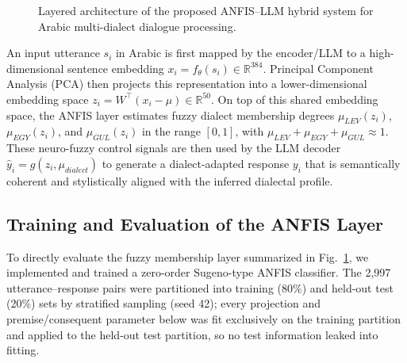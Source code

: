 \documentclass[conference]{IEEEtran}
\begin{document}
\begin{figure}[t]
\centering
{}
\caption{Layered architecture of the proposed ANFIS--LLM hybrid system for Arabic multi-dialect dialogue processing.}
\label{fig:architecture}
\end{figure}

An input utterance $s_i$ in Arabic is first mapped by the encoder/LLM to a high-dimensional sentence embedding $x_i = f_\theta(s_i) \in \mathbb{R}^{384}$. Principal Component Analysis (PCA) then projects this representation into a lower-dimensional embedding space $z_i = W^\top(x_i - \mu) \in \mathbb{R}^{50}$. On top of this shared embedding space, the ANFIS layer estimates fuzzy dialect membership degrees $\mu_{LEV}(z_i)$, $\mu_{EGY}(z_i)$, and $\mu_{GUL}(z_i)$ in the range $[0,1]$, with $\mu_{LEV} + \mu_{EGY} + \mu_{GUL} \approx 1$. These neuro-fuzzy control signals are then used by the LLM decoder $\hat{y}_i = g(z_i, \mu_{dialect})$ to generate a dialect-adapted response $y_i$ that is semantically coherent and stylistically aligned with the inferred dialectal profile.

\subsection{Training and Evaluation of the ANFIS Layer}
To directly evaluate the fuzzy membership layer summarized in Fig.~\ref{fig:architecture}, we implemented and trained a zero-order Sugeno-type ANFIS classifier. The 2,997 utterance--response pairs were partitioned into training (80\%) and held-out test (20\%) sets by stratified sampling (seed 42); every projection and premise/consequent parameter below was fit exclusively on the training partition and applied to the held-out test partition, so no test information leaked into fitting.
\end{document}
